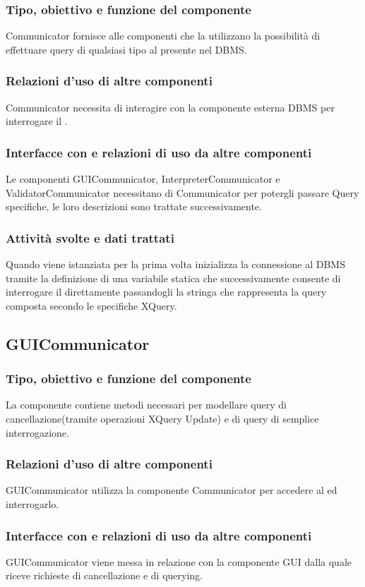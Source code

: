 \documentclass[11pt,titlepage,a4paper]{report}
\begin{document}
\subsubsection{Tipo, obiettivo e funzione del componente}
Communicator fornisce alle componenti che la utilizzano la possibilit\`a di effettuare query di qualsiasi tipo al \re presente nel DBMS.
\subsubsection{Relazioni d'uso di altre componenti}
Communicator necessita di interagire con la componente esterna DBMS per interrogare il \re.
\subsubsection{Interfacce con e relazioni di uso da altre componenti}
Le componenti GUICommunicator, InterpreterCommunicator e ValidatorCommunicator necessitano di Communicator per potergli passare Query specifiche, le loro descrizioni sono trattate successivamente.
\subsubsection{Attivit\`a svolte e dati trattati}
Quando viene istanziata per la prima volta inizializza la connessione al DBMS tramite la definizione di una variabile statica che successivamente consente di interrogare il \re direttamente passandogli la stringa che rappresenta la query composta secondo le specifiche XQuery.
%
\subsection{GUICommunicator}
\subsubsection{Tipo, obiettivo e funzione del componente}
La componente contiene metodi necessari per modellare query di cancellazione(tramite operazioni XQuery Update) e di query di semplice interrogazione.
\subsubsection{Relazioni d'uso di altre componenti}
GUICommunicator utilizza la componente Communicator per accedere al \re ed interrogarlo.
\subsubsection{Interfacce con e relazioni di uso da altre componenti}
GUICommunicator viene messa in relazione con la componente GUI dalla quale riceve richieste di cancellazione e di querying.%
\end{document}
